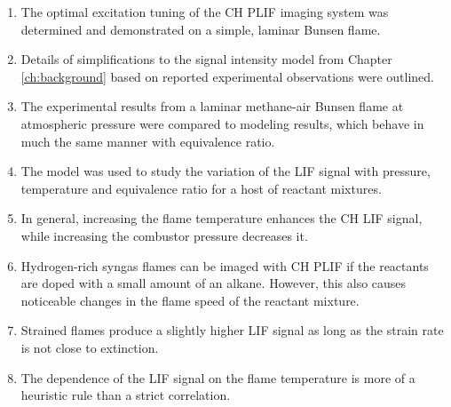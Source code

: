 \begin{enumerate}
  \item The optimal excitation tuning of the CH PLIF imaging system was determined and demonstrated on a simple, laminar Bunsen flame.
  \item Details of simplifications to the signal intensity model from Chapter \ref{ch:background} based on reported experimental observations were outlined.
  \item The experimental results from a laminar methane-air Bunsen flame at atmospheric pressure were compared to modeling results, which behave in much the same manner with equivalence ratio.
  \item The model was used to study the variation of the LIF signal with pressure, temperature and equivalence ratio for a host of reactant mixtures.
  \item In general, increasing the flame temperature enhances the CH LIF signal, while increasing the combustor pressure decreases it.
  \item Hydrogen-rich syngas flames can be imaged with CH PLIF if the reactants are doped with a small amount of an alkane.
    However, this also causes noticeable changes in the flame speed of the reactant mixture.
  \item Strained flames produce a slightly higher LIF signal as long as the strain rate is not close to extinction.
  \item The dependence of the LIF signal on the flame temperature is more of a heuristic rule than a strict correlation.
\end{enumerate}

